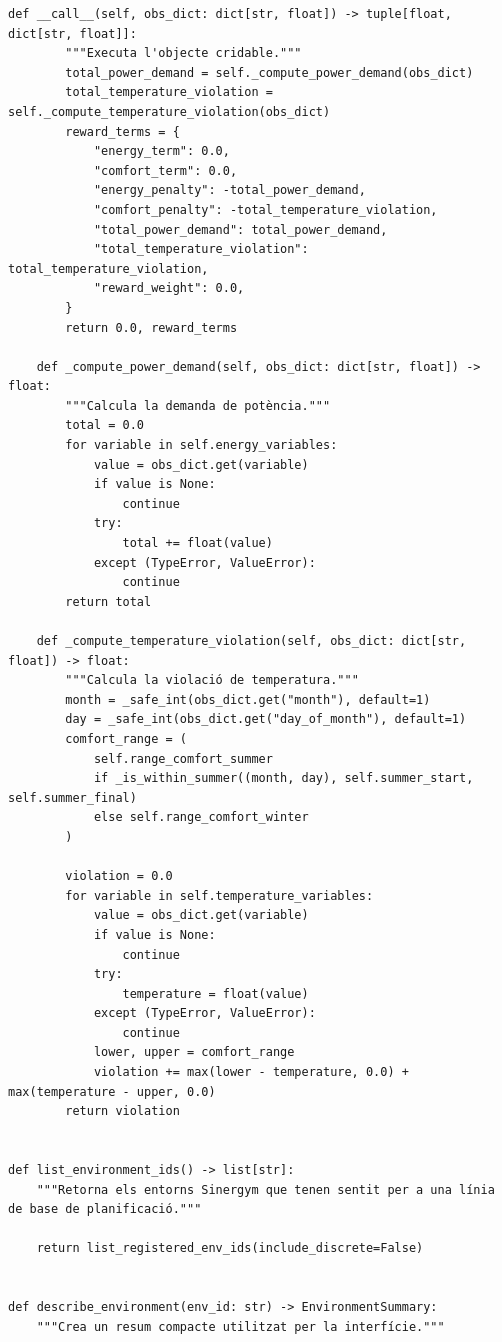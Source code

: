 \documentclass[10pt,a4paper]{article}
\begin{document}
\begin{lstlisting}[style=studioPython,caption={backend/simular\_entorn\_backend.py},label={lst:backend-simular-entorn-backend-py}]
    def __call__(self, obs_dict: dict[str, float]) -> tuple[float, dict[str, float]]:
        """Executa l'objecte cridable."""
        total_power_demand = self._compute_power_demand(obs_dict)
        total_temperature_violation = self._compute_temperature_violation(obs_dict)
        reward_terms = {
            "energy_term": 0.0,
            "comfort_term": 0.0,
            "energy_penalty": -total_power_demand,
            "comfort_penalty": -total_temperature_violation,
            "total_power_demand": total_power_demand,
            "total_temperature_violation": total_temperature_violation,
            "reward_weight": 0.0,
        }
        return 0.0, reward_terms

    def _compute_power_demand(self, obs_dict: dict[str, float]) -> float:
        """Calcula la demanda de potència."""
        total = 0.0
        for variable in self.energy_variables:
            value = obs_dict.get(variable)
            if value is None:
                continue
            try:
                total += float(value)
            except (TypeError, ValueError):
                continue
        return total

    def _compute_temperature_violation(self, obs_dict: dict[str, float]) -> float:
        """Calcula la violació de temperatura."""
        month = _safe_int(obs_dict.get("month"), default=1)
        day = _safe_int(obs_dict.get("day_of_month"), default=1)
        comfort_range = (
            self.range_comfort_summer
            if _is_within_summer((month, day), self.summer_start, self.summer_final)
            else self.range_comfort_winter
        )

        violation = 0.0
        for variable in self.temperature_variables:
            value = obs_dict.get(variable)
            if value is None:
                continue
            try:
                temperature = float(value)
            except (TypeError, ValueError):
                continue
            lower, upper = comfort_range
            violation += max(lower - temperature, 0.0) + max(temperature - upper, 0.0)
        return violation


def list_environment_ids() -> list[str]:
    """Retorna els entorns Sinergym que tenen sentit per a una línia de base de planificació."""

    return list_registered_env_ids(include_discrete=False)


def describe_environment(env_id: str) -> EnvironmentSummary:
    """Crea un resum compacte utilitzat per la interfície."""


\end{lstlisting}
\end{document}
